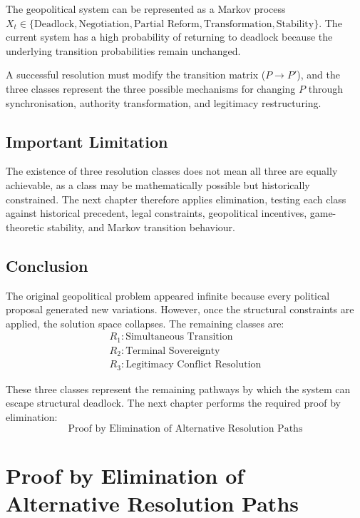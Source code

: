 \documentclass[11pt,openany]{book}
\theoremstyle{plain}
\theoremstyle{definition}
\begin{document}
The geopolitical system can be represented as a Markov process \(X_t \in \{\text{Deadlock}, \text{Negotiation}, \text{Partial Reform}, \text{Transformation}, \text{Stability}\}\). The current system has a high probability of returning to deadlock because the underlying transition probabilities remain unchanged. 

A successful resolution must modify the transition matrix (\(P \to P'\)), and the three classes represent the three possible mechanisms for changing \(P\) through synchronisation, authority transformation, and legitimacy restructuring.

\section*{Important Limitation}

The existence of three resolution classes does not mean all three are equally achievable, as a class may be mathematically possible but historically constrained. The next chapter therefore applies elimination, testing each class against historical precedent, legal constraints, geopolitical incentives, game-theoretic stability, and Markov transition behaviour.

\section*{Conclusion}

The original geopolitical problem appeared infinite because every political proposal generated new variations. However, once the structural constraints are applied, the solution space collapses. The remaining classes are:
\[
\begin{gathered}
\boxed{R_1: \text{Simultaneous Transition}} \\[6pt]
\boxed{R_2: \text{Terminal Sovereignty}} \\[6pt]
\boxed{R_3: \text{Legitimacy Conflict Resolution}}
\end{gathered}
\]

These three classes represent the remaining pathways by which the system can escape structural deadlock. The next chapter performs the required proof by elimination:
\[
\boxed{
\text{Proof by Elimination of Alternative Resolution Paths}
}
\]

\chapter{Proof by Elimination of Alternative Resolution Paths}
\end{document}
